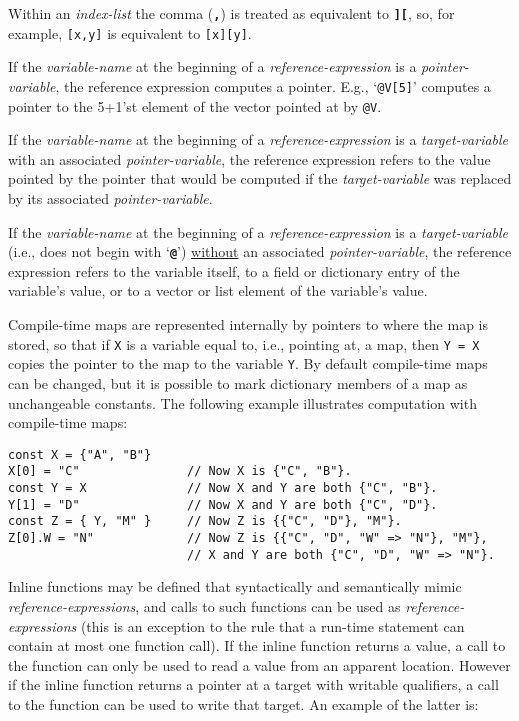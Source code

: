 \documentclass[12pt]{article}
\newcommand{\TT}[1]{{\tt \bfseries #1}}
\newcommand{\EOL}{\penalty \exhyphenpenalty}
\newenvironment{indpar}[1][0.3in]%
	{\begin{list}{}%
		     {\setlength{\itemsep}{0in}%
		      \setlength{\topsep}{0in}%
		      \setlength{\parsep}{1ex}%
		      \setlength{\labelwidth}{#1}%
		      \setlength{\leftmargin}{#1}%
		      \addtolength{\leftmargin}{\labelsep}}%
	 \item}%
	{\end{list}}
\begin{document}
Within an {\em index-list} the comma (\TT{,}) is treated
as equivalent to \TT{][}, so, for example, {\tt [x,y]}
is equivalent to {\tt [x][y]}.

If the {\em variable-name} at the beginning of a {\em reference-expression}
is a {\em pointer-variable}, the reference expression computes a pointer.
E.g., `{\tt @V[5]}' computes a pointer to the 5+1'st element of the
vector pointed at by {\tt @V}.

If the {\em variable-name} at the beginning of a {\em reference-expression}
is a {\em target-variable} with an associated {\em pointer-variable},
the reference expression refers to the value pointed by the pointer
that would be computed if the {\em target-variable} was replaced by
its associated {\em pointer-variable}.

If the {\em variable-name} at the beginning of a {\em reference-expression}
is a {\em target-variable} (i.e., does not begin with `\TT{@}')
\underline{without}
an associated {\em pointer-variable},
the reference expression refers to the variable itself,
to a field or dictionary entry of the variable's value,
or to a vector or list element of the variable's value.

Compile-time maps are represented internally by pointers to where
the map is stored, so that if {\tt X} is a variable equal to,
i.e., pointing at, a map, then {\tt Y = X} copies the pointer
to the map to the variable {\tt Y}.  By default compile-time
maps can be changed, but it is possible to mark dictionary members
of a map
as unchangeable constants.  The following example illustrates
computation with compile-time maps:
\begin{indpar}\begin{verbatim}
const X = {"A", "B"}
X[0] = "C"               // Now X is {"C", "B"}.
const Y = X              // Now X and Y are both {"C", "B"}. 
Y[1] = "D"               // Now X and Y are both {"C", "D"}. 
const Z = { Y, "M" }     // Now Z is {{"C", "D"}, "M"}.
Z[0].W = "N"             // Now Z is {{"C", "D", "W" => "N"}, "M"},
                         // X and Y are both {"C", "D", "W" => "N"}.
\end{verbatim}\end{indpar}


Inline functions may be defined that syntactically and semantically mimic
{\em reference-\EOL expres\-sions}, and calls to such functions
can be used as {\em reference-expressions} (this is an exception
to the rule that a run-time statement can contain at most one function
call).  If the inline function returns a value, a call to the function
can only be used to read a value from an apparent
location.  However if the inline function returns a pointer at a target
with writable qualifiers, a call to the function can be used
to write that target.  An example of the latter is:
\label{REFERENCE-EXPRESSION-FUNCTION-EXAMPLE}
\end{document}
